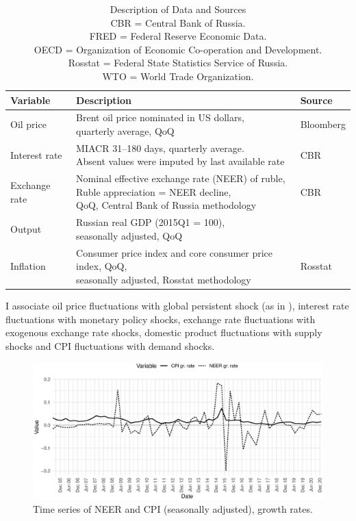 \documentclass[12pt, a4paper]{extarticle}
\begin{document}
\begin{table}[b!]
	\centering
	\begin{tabular}{@{}lll@{}}
		\toprule
		Variable  & Description                                              & Source    \\ \midrule
		Oil price & \makecell[l]{Brent oil price nominated in US dollars, \\quarterly average, QoQ} & Bloomberg \\
		Interest rate & \makecell[l]{MIACR 31--180 days, quarterly average. \\Absent values were imputed by last available rate} & CBR        \\
		Exchange rate & \makecell[l]{Nominal effective exchange rate (NEER) of ruble, \\Ruble appreciation = NEER decline, \\QoQ, Central Bank of Russia methodology} & CBR        \\
		Output        & \makecell[l]{Russian real GDP (2015Q1 = 100), \\seasonally adjusted, QoQ}  & \makecell[l]{FRED} \\
		Inflation & \makecell[l]{Consumer price index and core consumer price index, QoQ, \\seasonally adjusted, Rosstat methodology }          & Rosstat   \\ \bottomrule
	\end{tabular}%
	\caption{Description of Data and Sources\\	
		CBR = Central Bank of Russia.\\
		FRED = Federal Reserve Economic Data.\\
		OECD = Organization of Economic Co-operation and Development.\\
		Rosstat = Federal State Statistics Service of Russia.\\
		WTO = World Trade Organization.}
	\label{table:variables_decription}
\end{table}

I associate oil price fluctuations with global persistent shock (as in \cite{Forbes2018}), interest rate fluctuations with monetary policy shocks, exchange rate fluctuations with exogenous exchange rate shocks, domestic product fluctuations with supply shocks and CPI fluctuations with demand shocks.
\begin{figure}
	\centering
	\includegraphics[width=0.8\linewidth]{figures/neer_cpi}
	\caption[]{Time series of NEER and CPI (seasonally adjusted), growth rates.}
	\label{fig:neer_cpi}
\end{figure}
\end{document}
